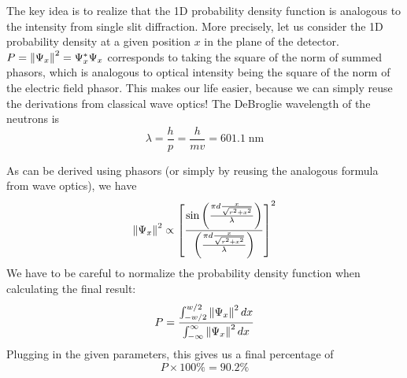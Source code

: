 \begin{solution}
The key idea is to realize that the 1D probability density function is analogous to the intensity from single slit diffraction. More precisely, let us consider the 1D probability density at a given position $x$ in the plane of the detector. $P = \norm{\Psi_x}^2 = \Psi_x ^{\ast} \Psi_x$ corresponds to taking the square of the norm of summed phasors, which is analogous to optical intensity being the square of the norm of the electric field phasor.
\newline
\newline
This makes our life easier, because we can simply reuse the derivations from classical wave optics! The DeBroglie wavelength of the neutrons is $$\lambda = \frac{h}{p} = \frac{h}{mv} = 601.1\;\mathrm{nm}$$ 

As can be derived using phasors (or simply by reusing the analogous formula from wave optics), we have
$$\norm{\Psi_x}^2 \propto {\left[\frac {\sin \left(\frac {\pi d \frac{x}{\sqrt{r^2 + x^2}}}{\lambda}\right)}{\left(\frac {\pi d \frac{x}{\sqrt{r^2 + x^2}}}{\lambda}\right)}\right]^2} $$
We have to be careful to normalize the probability density function when calculating the final result:
$$P = \frac {\int_{-w/2}^{w/2}\norm{\Psi_x}^2\,dx}{\int_{-\infty}^{\infty}\norm{\Psi_x}^2\,dx} $$
Plugging in the given parameters, this gives us a final percentage of $$P\times100\% = \boxed{90.2\%}$$


\end{solution}